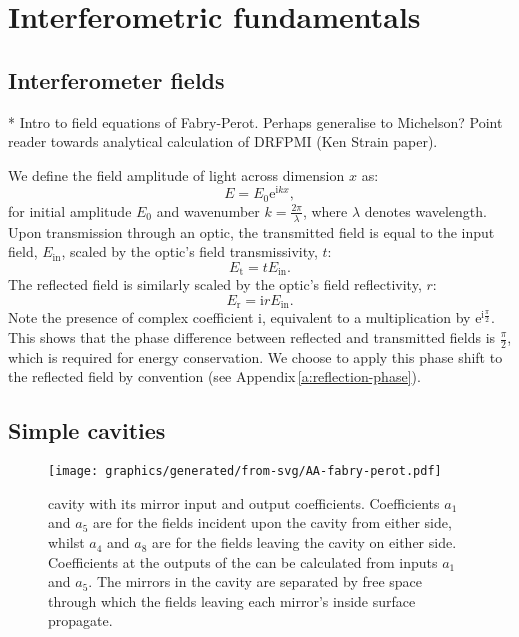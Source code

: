 \chapter{\label{a:interferometry}Interferometric fundamentals}
\section{Interferometer fields}
* Intro to field equations of Fabry-Perot. Perhaps generalise to Michelson? Point reader towards analytical calculation of DRFPMI (Ken Strain paper).

We define the field amplitude of light across dimension $x$ as:
\begin{equation}
  \label{eq:field-amplitude}
  E = E_0 \text{e}^{\text{i} kx},
\end{equation}
for initial amplitude $E_0$ and wavenumber $k = \frac{2 \pi}{\lambda}$, where $\lambda$ denotes wavelength. Upon transmission through an optic, the transmitted field is equal to the input field, $E_{\text{in}}$, scaled by the optic's field transmissivity, $t$:
\begin{equation}
  \label{eq:transmitted-field}
  E_{\text{t}} = tE_{\text{in}}.
\end{equation}
The reflected field is similarly scaled by the optic's field reflectivity, $r$:
\begin{equation}
  \label{eq:reflected-field}
  E_{\text{r}} = \text{i}rE_{\text{in}}.
\end{equation}
Note the presence of complex coefficient $\text{i}$, equivalent to a multiplication by $\text{e}^{\text{i} \frac{\pi}{2}}$. This shows that the phase difference between reflected and transmitted fields is $\frac{\pi}{2}$, which is required for energy conservation. We choose to apply this phase shift to the reflected field by convention (see Appendix\,\ref{a:reflection-phase}).

\section{\label{sec:simple-cavities}Simple cavities}

\begin{figure}
  \centering
  \texttt{[image: graphics/generated/from-svg/AA-fabry-perot.pdf]}
  \caption[\FP{} cavity with its mirror input and output coefficients]{\label{fig:fabry-perot}\FP{} cavity with its mirror input and output coefficients. Coefficients $a_1$ and $a_5$ are for the fields incident upon the cavity from either side, whilst $a_4$ and $a_8$ are for the fields leaving the cavity on either side. Coefficients at the outputs of the \FP{} can be calculated from inputs $a_1$ and $a_5$. The mirrors in the cavity are separated by free space through which the fields leaving each mirror's inside surface propagate.}
\end{figure}

